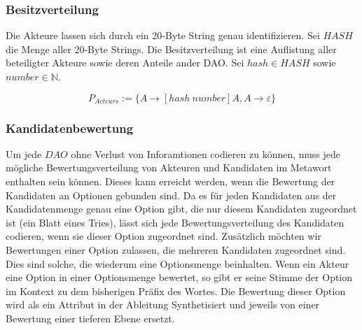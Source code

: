 \documentclass[a4paper,12pt]{article}
\begin{document}
% 
% 
% 
% 


\subsubsection*{Besitzverteilung}
Die Akteure lassen sich durch ein 20-Byte String genau identifizieren. Sei $HASH$ die Menge aller 20-Byte Strings. Die Besitzverteilung ist eine Auflistung aller beteiligter Akteure sowie deren Anteile ander DAO.
Sei $hash\in HASH$ sowie $number\in\mathbb{N}$.

\[ P_{Acteurs} := \{A\rightarrow[hash\ number]A,A\rightarrow \varepsilon\} \] 


\subsubsection*{Kandidatenbewertung}
Um jede $DAO$ ohne Verlust von Inforamtionen codieren zu können, muss jede mögliche Bewertungsverteilung von Akteuren und Kandidaten im Metawort enthalten sein können. 
Dieses kann erreicht werden, wenn die Bewertung der Kandidaten an Optionen gebunden sind. Da es für jeden Kandidaten aus der Kandidatenmenge genau eine Option gibt, die nur diesem Kandidaten zugeordnet ist (ein Blatt eines Tries), lässt sich jede Bewertungsverteilung des Kandidaten codieren, wenn sie dieser Option zugeordnet sind. Zusätzlich möchten wir Bewertungen einer Option zulassen, die mehreren Kandidaten zugeordnet sind. Dies sind solche, die wiederum eine Optionsmenge beinhalten. Wenn ein Akteur eine Option in einer Optionsmenge bewertet, so gibt er seine Stimme der Option im Kontext zu dem bisherigen Präfix des Wortes.
Die Bewertung dieser Option wird als ein Attribut in der Ableitung Synthetisiert\cite{Knuth1968} und jeweils von einer Bewertung einer tieferen Ebene ersetzt.
\end{document}
